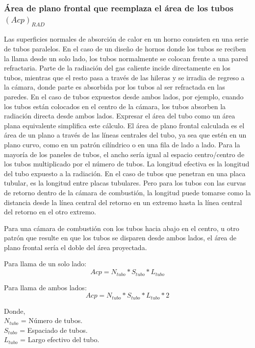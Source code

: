 \subsubsection{Área de plano frontal que reemplaza el área de los tubos $(Acp)_{RAD}$}
\par Las superficies normales de absorción de calor en un horno consisten en una serie de tubos paralelos. En el caso de un diseño de hornos donde los tubos se reciben la llama desde un solo lado, los tubos normalmente se colocan frente a una pared refractaria. Parte de la radiación del gas caliente incide directamente en los tubos, mientras que el resto pasa a través de las hileras y se irradia de regreso a la cámara, donde parte es absorbida por los tubos al ser refractada en las paredes. En el caso de tubos expuestos desde ambos lados, por ejemplo, cuando los tubos están colocados en el centro de la cámara, los tubos absorben la radiación directa desde ambos lados. Expresar el área del tubo como un área plana equivalente simplifica este cálculo. El área de plano frontal calculada es el área de un plano a través de las líneas centrales del tubo, ya sea que estén en un plano curvo, como en un patrón cilíndrico o en una fila de lado a lado. Para la mayoría de los paneles de tubos, el ancho sería igual al espacio centro/centro de los tubos multiplicado por el número de tubos. La longitud efectiva es la longitud del tubo expuesto a la radiación. En el caso de tubos que penetran en una placa tubular, es la longitud entre placas tubulares. Pero para los tubos con las curvas de retorno dentro de la cámara de combustión, la longitud puede tomarse como la distancia desde la línea central del retorno en un extremo hasta la línea central del retorno en el otro extremo.
\par Para una cámara de combustión con los tubos hacia abajo en el centro, u otro patrón que resulte en que los tubos se disparen desde ambos lados, el área de plano frontal sería el doble del área proyectada.
\par Para llama de un solo lado:
\begin{equation}
Acp = N_{tubo} * S_{tubo} * L_{tubo}
\end{equation}
\par Para llama de ambos lados:
\begin{equation}
Acp = N_{tubo} * S_{tubo} * L_{tubo} * 2
\end{equation}
\par Donde, \\
$N_{tubo}$ = Número de tubos. \\
$S_{tubo}$ = Espaciado de tubos. \\
$L_{tubo}$ = Largo efectivo del tubo.

